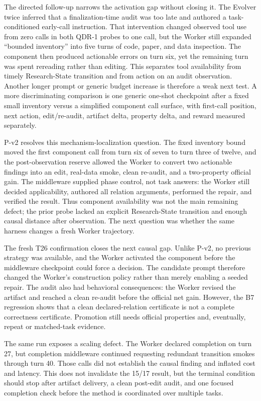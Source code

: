 The directed follow-up narrows the activation gap without closing it. The
Evolver twice inferred that a finalization-time audit was too late and authored
a task-conditioned early-call instruction. That intervention changed observed
tool use from zero calls in both QDR-1 probes to one call, but the Worker still
expanded ``bounded inventory'' into five turns of code, paper, and data
inspection. The component then produced actionable errors on turn six, yet the
remaining turn was spent rereading rather than editing. This separates tool
availability from timely Research-State transition and from action on an audit
observation. Another longer prompt or generic budget increase is therefore a
weak next test. A more discriminating comparison is one generic one-shot
checkpoint after a fixed small inventory versus a simplified component call
surface, with first-call position, next action, edit/re-audit, artifact delta,
property delta, and reward measured separately.

P-v2 resolves this mechanism-localization question. The fixed inventory bound
moved the first component call from turn six of seven to turn three of twelve,
and the post-observation reserve allowed the Worker to convert two actionable
findings into an edit, real-data smoke, clean re-audit, and a two-property
official gain. The middleware supplied phase control, not task answers: the
Worker still decided applicability, authored all relation arguments, performed
the repair, and verified the result. Thus component availability was not the
main remaining defect; the prior probe lacked an explicit Research-State
transition and enough causal distance after observation. The next question was
whether the same harness changes a fresh Worker trajectory.

The fresh T26 confirmation closes the next causal gap. Unlike P-v2, no previous
strategy was available, and the Worker activated the component before the
middleware checkpoint could force a decision. The candidate prompt therefore
changed the Worker's construction policy rather than merely enabling a seeded
repair. The audit also had behavioral consequences: the Worker revised the
artifact and reached a clean re-audit before the official net gain. However,
the B7 regression shows that a clean declared-relation certificate is not a
complete correctness certificate. Promotion still needs official properties
and, eventually, repeat or matched-task evidence.

The same run exposes a scaling defect. The Worker declared completion on turn
27, but completion middleware continued requesting redundant transition
smokes through turn 40. Those calls did not establish the causal finding and
inflated cost and latency. This does not invalidate the 15/17 result, but the
terminal condition should stop after artifact delivery, a clean post-edit
audit, and one focused completion check before the method is coordinated over
multiple tasks.

